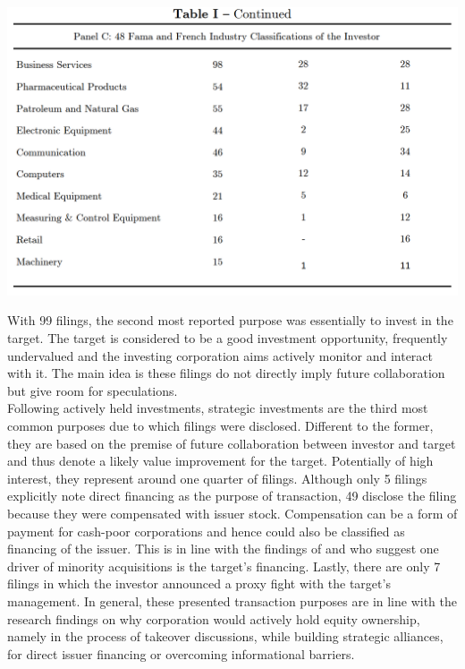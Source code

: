 \documentclass[12pt]{article}
\begin{document}
\begin{table}[!htbp]
	\centering
	\begin{adjustbox}{width=\textwidth}
		\includegraphics{descriptive2final}
	\end{adjustbox}
\end{table}
\noindent With 99 filings, the second most reported purpose was essentially to invest in the target. The target is considered to be a good investment opportunity, frequently undervalued and the investing corporation aims actively monitor and interact with it. The main idea is these filings do not directly imply future collaboration but give room for speculations. \\
Following actively held investments, strategic investments are the third most common purposes due to which filings were disclosed. Different to the former, they are based on the premise of future collaboration between investor and target and thus denote a likely value improvement for the target. Potentially of high interest, they represent around one quarter of filings. Although only 5 filings explicitly note direct financing as the purpose of transaction, 49 disclose the filing because they were compensated with issuer stock. Compensation can be a form of payment for cash-poor corporations and hence could also be classified as financing of the issuer. This is in line with the findings of \citet[p.2792]{Allen2000} and \citet[p.78]{Liao2014} who suggest one driver of minority acquisitions is the target's financing. Lastly, there are only 7 filings in which the investor announced a proxy fight with the target's management. In general, these presented transaction purposes are in line with the research findings on why corporation would actively hold equity ownership, namely in the process of takeover discussions, while building strategic alliances, for direct issuer financing or overcoming informational barriers.\\
\end{document}
